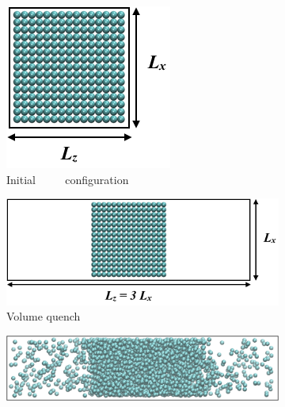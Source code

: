 \documentclass[9pt,tutorial]{livecoms}
\begin{document}
\begin{figure}[h]
\centering
	\begin{subfigure}{0.11\textwidth} %
    \includegraphics[width=\textwidth]{gfx/image16.png}
		\caption{Initial $\qquad$ configuration} %
	\end{subfigure}
	\begin{subfigure}{0.31\textwidth} %
    \includegraphics[width=\textwidth]{gfx/image17.png}
    \caption{Volume quench}
	\end{subfigure}
	\begin{subfigure}{0.4\textwidth} %
    \includegraphics[width=\textwidth]{gfx/image18.png}

\end{subfigure}
\end{figure}
\end{document}
